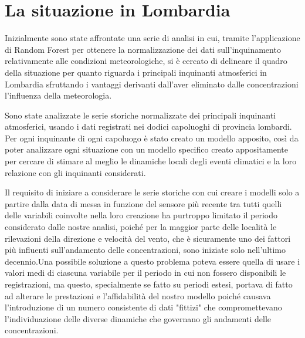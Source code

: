 \documentclass[a4paper]{report}
\begin{document}





\chapter{La situazione in Lombardia}
Inizialmente sono state affrontate una serie di analisi in cui, tramite l'applicazione di Random Forest
per ottenere la normalizzazione dei dati sull'inquinamento relativamente alle condizioni meteorologiche, si è cercato di delineare il quadro della situazione per quanto riguarda i principali inquinanti atmosferici in Lombardia sfruttando i vantaggi derivanti dall'aver eliminato dalle concentrazioni l'influenza della meteorologia.

Sono state analizzate le serie storiche normalizzate dei principali inquinanti atmosferici, usando i dati registrati nei dodici capoluoghi di provincia lombardi. Per ogni inquinante di ogni capoluogo è stato creato un modello apposito, così da poter analizzare ogni situazione con un modello specifico creato appositamente per cercare di stimare al meglio le dinamiche locali degli eventi climatici e la loro relazione con gli inquinanti considerati. 

Il requisito di iniziare a considerare le serie storiche con cui creare i modelli solo a partire dalla data di messa in funzione del sensore più recente tra tutti quelli delle variabili coinvolte nella loro creazione ha purtroppo limitato il periodo considerato dalle nostre analisi, poiché per la maggior parte delle località le rilevazioni della direzione e velocità del vento, che è sicuramente uno dei fattori più influenti sull'andamento delle concentrazioni, sono iniziate solo nell'ultimo decennio.Una possibile soluzione a questo problema poteva essere quella di usare i valori medi di ciascuna variabile per il periodo in cui non fossero disponibili le registrazioni, ma questo, specialmente se fatto su periodi estesi, portava di fatto ad alterare le prestazioni e l'affidabilità del nostro modello poiché causava l'introduzione di un numero consistente di dati "fittizi"
 che compromettevano l'individuazione delle diverse dinamiche che governano gli andamenti delle concentrazioni.
\end{document}
